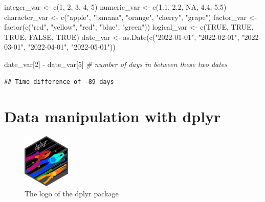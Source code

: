 \documentclass[
  12pt,
  oneside]{book}
\newenvironment{Shaded}{\begin{snugshade}}{\end{snugshade}}
\newcommand{\CommentTok}[1]{\textcolor[rgb]{0.56,0.35,0.01}{\textit{#1}}}
\newcommand{\ConstantTok}[1]{\textcolor[rgb]{0.00,0.00,0.00}{#1}}
\newcommand{\DecValTok}[1]{\textcolor[rgb]{0.00,0.00,0.81}{#1}}
\newcommand{\FloatTok}[1]{\textcolor[rgb]{0.00,0.00,0.81}{#1}}
\newcommand{\FunctionTok}[1]{\textcolor[rgb]{0.00,0.00,0.00}{#1}}
\newcommand{\NormalTok}[1]{#1}
\newcommand{\OtherTok}[1]{\textcolor[rgb]{0.56,0.35,0.01}{#1}}
\newcommand{\SpecialCharTok}[1]{\textcolor[rgb]{0.00,0.00,0.00}{#1}}
\newcommand{\StringTok}[1]{\textcolor[rgb]{0.31,0.60,0.02}{#1}}
\theoremstyle{definition}
\theoremstyle{definition}
\theoremstyle{definition}
\theoremstyle{definition}
\theoremstyle{remark}
\begin{document}
\begin{Shaded}
\begin{Highlighting}[]
\NormalTok{integer\_var }\OtherTok{\textless{}{-}} \FunctionTok{c}\NormalTok{(}\DecValTok{1}\NormalTok{, }\DecValTok{2}\NormalTok{, }\DecValTok{3}\NormalTok{, }\DecValTok{4}\NormalTok{, }\DecValTok{5}\NormalTok{)}
\NormalTok{numeric\_var }\OtherTok{\textless{}{-}} \FunctionTok{c}\NormalTok{(}\FloatTok{1.1}\NormalTok{, }\FloatTok{2.2}\NormalTok{, }\ConstantTok{NA}\NormalTok{, }\FloatTok{4.4}\NormalTok{, }\FloatTok{5.5}\NormalTok{)}
\NormalTok{character\_var }\OtherTok{\textless{}{-}} \FunctionTok{c}\NormalTok{(}\StringTok{"apple"}\NormalTok{, }\StringTok{"banana"}\NormalTok{, }\StringTok{"orange"}\NormalTok{, }\StringTok{"cherry"}\NormalTok{, }\StringTok{"grape"}\NormalTok{)}
\NormalTok{factor\_var }\OtherTok{\textless{}{-}} \FunctionTok{factor}\NormalTok{(}\FunctionTok{c}\NormalTok{(}\StringTok{"red"}\NormalTok{, }\StringTok{"yellow"}\NormalTok{, }\StringTok{"red"}\NormalTok{, }\StringTok{"blue"}\NormalTok{, }\StringTok{"green"}\NormalTok{))}
\NormalTok{logical\_var }\OtherTok{\textless{}{-}} \FunctionTok{c}\NormalTok{(}\ConstantTok{TRUE}\NormalTok{, }\ConstantTok{TRUE}\NormalTok{, }\ConstantTok{TRUE}\NormalTok{, }\ConstantTok{FALSE}\NormalTok{, }\ConstantTok{TRUE}\NormalTok{)}
\NormalTok{date\_var }\OtherTok{\textless{}{-}} \FunctionTok{as.Date}\NormalTok{(}\FunctionTok{c}\NormalTok{(}\StringTok{"2022{-}01{-}01"}\NormalTok{, }\StringTok{"2022{-}02{-}01"}\NormalTok{, }\StringTok{"2022{-}03{-}01"}\NormalTok{, }\StringTok{"2022{-}04{-}01"}\NormalTok{, }\StringTok{"2022{-}05{-}01"}\NormalTok{))}

\NormalTok{date\_var[}\DecValTok{2}\NormalTok{] }\SpecialCharTok{{-}}\NormalTok{ date\_var[}\DecValTok{5}\NormalTok{] }\CommentTok{\# number of days in between these two dates}
\end{Highlighting}
\end{Shaded}

\begin{verbatim}
## Time difference of -89 days
\end{verbatim}

\hypertarget{data-manipulation-with-dplyr}{%
\section{Data manipulation with dplyr}\label{data-manipulation-with-dplyr}}

\begin{figure}
\centering
\includegraphics[width=0.2\textwidth,height=\textheight]{fig/dplyr-logo.png}
\caption{\label{fig:dplyr-logo} The logo of the dplyr package}
\end{figure}
\end{document}
